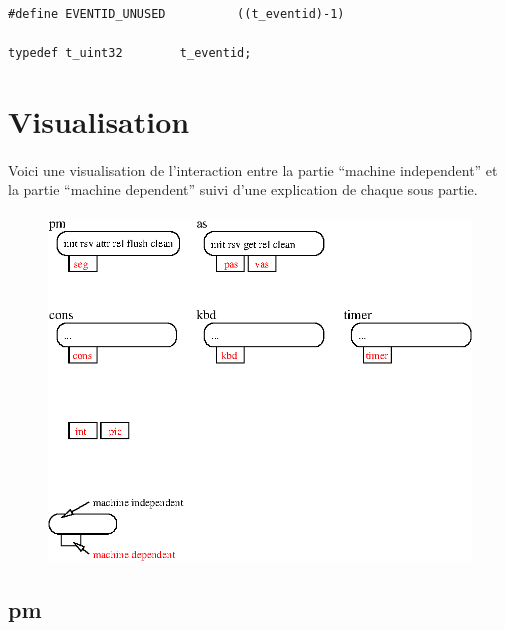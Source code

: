 \documentclass[10pt,a4wide]{article}
\begin{document}
\begin{verbatim}
#define EVENTID_UNUSED          ((t_eventid)-1)

typedef t_uint32        t_eventid;
\end{verbatim}

\newpage

\section{Visualisation}

\paragraph{}

Voici une visualisation de l'interaction entre la partie
``machine independent'' et la partie ``machine dependent'' suivi
d'une explication de chaque sous partie.

\paragraph{}

\begin{figure}[h]
\centerline{\includegraphics{figures/interfaces.eps}}
\end{figure}

\subsection{pm}
\end{document}
